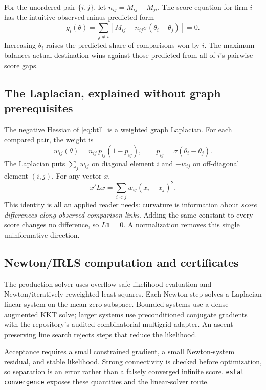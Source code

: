 \documentclass[11pt]{article}
\begin{document}
For the unordered pair $\{i,j\}$, let $n_{ij}=M_{ij}+M_{ji}$. The score equation
for firm $i$ has the intuitive observed-minus-predicted form
\begin{equation}
  g_i(\theta)=\sum_{j\neq i}
  \left[M_{ij}-n_{ij}\sigma(\theta_i-\theta_j)\right]=0.
  \label{eq:btgradient}
\end{equation}
Increasing $\theta_i$ raises the predicted share of comparisons won by $i$.
The maximum balances actual destination wins against those predicted from all
of $i$'s pairwise score gaps.

\subsection{The Laplacian, explained without graph prerequisites}

The negative Hessian of \cref{eq:btll} is a weighted graph Laplacian. For each
compared pair, the weight is
\begin{equation}
  w_{ij}(\theta)=n_{ij}\,p_{ij}(1-p_{ij}),
  \qquad p_{ij}=\sigma(\theta_i-\theta_j).
\end{equation}
The Laplacian puts $\sum_j w_{ij}$ on diagonal element $i$ and $-w_{ij}$ on
off-diagonal element $(i,j)$. For any vector $x$,
\begin{equation}
  x'Lx=\sum_{i<j}w_{ij}(x_i-x_j)^2.
  \label{eq:laplacian}
\end{equation}
This identity is all an applied reader needs: curvature is information about
\emph{score differences along observed comparison links}. Adding the same
constant to every score changes no difference, so $L\mathbf{1}=0$. A
normalization removes this single uninformative direction.

\subsection{Newton/IRLS computation and certificates}

The production solver uses overflow-safe likelihood evaluation and
Newton/iteratively reweighted least squares. Each Newton step solves a
Laplacian linear system on the mean-zero subspace. Bounded systems use a dense
augmented KKT solve; larger systems use preconditioned conjugate gradients with
the repository's audited combinatorial-multigrid adapter. An ascent-preserving
line search rejects steps that reduce the likelihood.

Acceptance requires a small constrained gradient, a small Newton-system
residual, and stable likelihood. Strong connectivity is checked before
optimization, so separation is an error rather than a falsely converged
infinite score. \texttt{estat convergence} exposes these quantities and the
linear-solver route.
\end{document}

